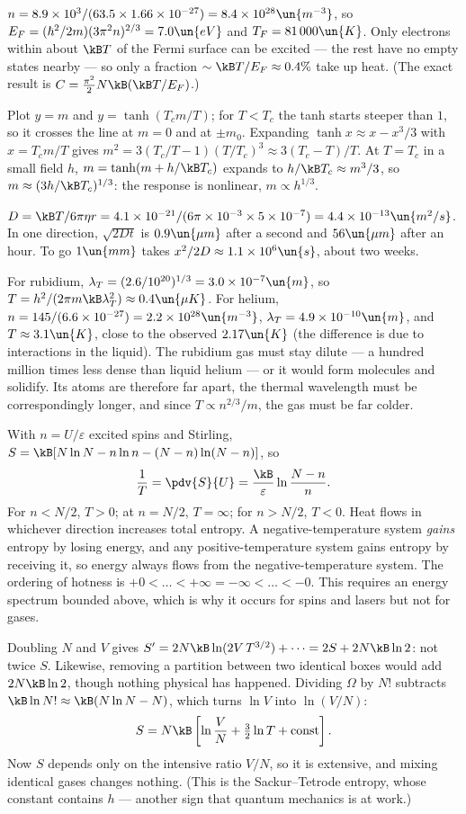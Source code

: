  $n = 8.9\times10^3/(63.5\times1.66\times10^{-27}) = 8.4\times10^{28}\un{m^{-3}}$, so $E_F = (\hbar^2/2m)(3\pi^2n)^{2/3} = 7.0\un{eV}$ and $T_F = 81\,000\un{K}$. Only electrons within about $\kB T$ of the Fermi surface can be excited --- the rest have no empty states nearby --- so only a fraction $\sim\kB T/E_F\approx0.4\%$ take up heat. (The exact result is $C = \tfrac{\pi^2}{2}N\kB(\kB T/E_F)$.)

 Plot $y = m$ and $y = \tanh(T_cm/T)$; for $T<T_c$ the tanh starts steeper than $1$, so it crosses the line at $m = 0$ and at $\pm m_0$. Expanding $\tanh x\approx x - x^3/3$ with $x = T_cm/T$ gives $m^2 = 3(T_c/T-1)(T/T_c)^3\approx3(T_c-T)/T$. At $T = T_c$ in a small field $h$, $m = \tanh(m + h/\kB T_c)$ expands to $h/\kB T_c\approx m^3/3$, so $m\approx(3h/\kB T_c)^{1/3}$: the response is nonlinear, $m\propto h^{1/3}$.

 $D = \kB T/6\pi\eta r = 4.1\times10^{-21}/(6\pi\times10^{-3}\times5\times10^{-7}) = 4.4\times10^{-13}\un{m^2/s}$. In one direction, $\sqrt{2Dt}$ is $0.9\un{\mu m}$ after a second and $56\un{\mu m}$ after an hour. To go $1\un{mm}$ takes $x^2/2D\approx1.1\times10^6\un{s}$, about two weeks.

 For rubidium, $\lambda_T = (2.6/10^{20})^{1/3} = 3.0\times10^{-7}\un{m}$, so $T = h^2/(2\pi m\kB\lambda_T^2)\approx0.4\un{\mu K}$. For helium, $n = 145/(6.6\times10^{-27}) = 2.2\times10^{28}\un{m^{-3}}$, $\lambda_T = 4.9\times10^{-10}\un{m}$, and $T\approx3.1\un{K}$, close to the observed $2.17\un{K}$ (the difference is due to interactions in the liquid). The rubidium gas must stay dilute --- a hundred million times less dense than liquid helium --- or it would form molecules and solidify. Its atoms are therefore far apart, the thermal wavelength must be correspondingly longer, and since $T\propto n^{2/3}/m$, the gas must be far colder.

 With $n = U/\varepsilon$ excited spins and Stirling, $S = \kB[N\ln N - n\ln n - (N-n)\ln(N-n)]$, so
\[
  \frac1T = \pdv{S}{U} = \frac{\kB}{\varepsilon}\ln\frac{N-n}{n}.
\]
For $n<N/2$, $T>0$; at $n = N/2$, $T = \infty$; for $n>N/2$, $T<0$. Heat flows in whichever direction increases total entropy. A negative-temperature system \emph{gains} entropy by losing energy, and any positive-temperature system gains entropy by receiving it, so energy always flows from the negative-temperature system. The ordering of hotness is $+0<\dots<+\infty = -\infty<\dots<-0$. This requires an energy spectrum bounded above, which is why it occurs for spins and lasers but not for gases.

 Doubling $N$ and $V$ gives $S' = 2N\kB\ln(2V\,T^{3/2}) + \dots = 2S + 2N\kB\ln2$: not twice $S$. Likewise, removing a partition between two identical boxes would add $2N\kB\ln2$, though nothing physical has happened. Dividing $\Omega$ by $N!$ subtracts $\kB\ln N!\approx\kB(N\ln N - N)$, which turns $\ln V$ into $\ln(V/N)$:
\[
  S = N\kB\left[\ln\frac{V}{N} + \tfrac32\ln T + \text{const}\right].
\]
Now $S$ depends only on the intensive ratio $V/N$, so it is extensive, and mixing identical gases changes nothing. (This is the Sackur--Tetrode entropy, whose constant contains $h$ --- another sign that quantum mechanics is at work.)

